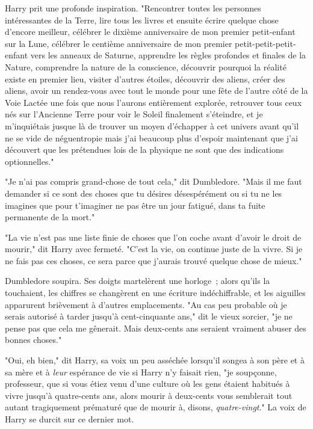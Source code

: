 Harry prit une profonde inspiration. "Rencontrer toutes les personnes intéressantes de la Terre, lire tous les livres et ensuite écrire quelque chose d'encore meilleur, célébrer le dixième anniversaire de mon premier petit-enfant sur la Lune, célébrer le centième anniversaire de mon premier petit-petit-petit-enfant vers les anneaux de Saturne, apprendre les règles profondes et finales de la Nature, comprendre la nature de la conscience, découvrir pourquoi la réalité existe en premier lieu, visiter d'autres étoiles, découvrir des aliens, créer des aliens, avoir un rendez-vous avec tout le monde pour une fête de l'autre côté de la Voie Lactée une fois que nous l'aurons entièrement explorée, retrouver tous ceux nés sur l'Ancienne Terre pour voir le Soleil finalement s'éteindre, et je m'inquiétais jusque là de trouver un moyen d'échapper à cet univers avant qu'il ne se vide de néguentropie mais j'ai beaucoup plus d'espoir maintenant que j'ai découvert que les prétendues lois de la physique ne sont que des indications optionnelles."

"Je n'ai pas compris grand-chose de tout cela," dit Dumbledore. "Mais il me faut demander si ce sont des choses que tu désires désespérément ou si tu ne les imagines que pour t'imaginer ne pas être un jour fatigué, dans ta fuite permanente de la mort."

"La vie n'est pas une liste finie de choses que l'on coche avant d'avoir le droit de mourir," dit Harry avec fermeté. "C'est la vie, on continue juste de la vivre. Si je ne fais pas ces choses, ce sera parce que j'aurais trouvé quelque chose de mieux."

Dumbledore soupira. Ses doigts martelèrent une horloge~; alors qu'ils la touchaient, les chiffres se changèrent en une écriture indéchiffrable, et les aiguilles apparurent brièvement à d'autres emplacements. "Au cas peu probable où je serais autorisé à tarder jusqu'à cent-cinquante ans," dit le vieux sorcier, "je ne pense pas que cela me gênerait. Mais deux-cents ans seraient vraiment abuser des bonnes choses."

"Oui, eh bien," dit Harry, sa voix un peu asséchée lorsqu'il songea à son père et à sa mère et à \emph{leur} espérance de vie si Harry n'y faisait rien, "je soupçonne, professeur, que si vous étiez venu d'une culture où les gens étaient habitués à vivre jusqu'à quatre-cents ans, alors mourir à deux-cents vous semblerait tout autant tragiquement prématuré que de mourir à, disons, \emph{quatre-vingt}." La voix de Harry se durcit sur ce dernier mot.

